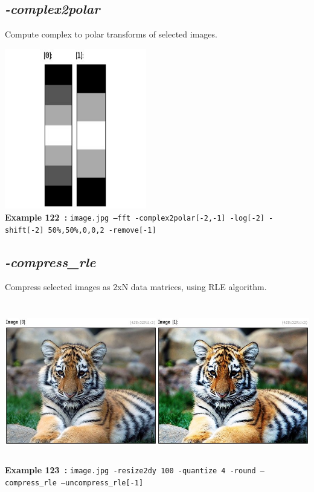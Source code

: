 \documentclass[a4paper,11pt,twoside]{book}
\begin{document}
\subsection{\emph{-complex2polar} }\vspace*{-0.5em}
Compute complex to polar transforms of selected images.
\begin{center}\includegraphics[keepaspectratio=true,height=7cm,width=\textwidth]{img/gmic_def122.jpg}\\
{\footnotesize \textbf{Example 122~:} \texttt{image.jpg --fft -complex2polar[-2,-1] -log[-2] -shift[-2] 50\%,50\%,0,0,2 -remove[-1]}}
\end{center}

\subsection{\emph{-compress\_rle} }\vspace*{-0.5em}
Compress selected images as 2xN data matrices, using RLE algorithm.
\begin{center}\includegraphics[keepaspectratio=true,height=7cm,width=\textwidth]{img/gmic_def123.jpg}\\
{\footnotesize \textbf{Example 123~:} \texttt{image.jpg -resize2dy 100 -quantize 4 -round --compress\_rle --uncompress\_rle[-1]}}
\end{center}
\end{document}
